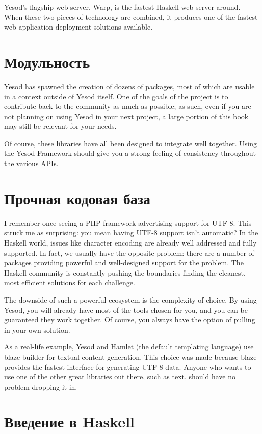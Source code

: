 Yesod's flagship web server, Warp, is the fastest Haskell web server around. When these two pieces of technology are combined, it produces one of the fastest web application deployment solutions available.

\section{Модульность}

Yesod has spawned the creation of dozens of packages, most of which are usable in a context outside of Yesod itself. One of the goals of the project is to contribute back to the community as much as possible; as such, even if you are not planning on using Yesod in your next project, a large portion of this book may still be relevant for your needs.

Of course, these libraries have all been designed to integrate well together. Using the Yesod Framework should give you a strong feeling of consistency throughout the various APIs.

\section{Прочная кодовая база}

I remember once seeing a PHP framework advertising support for UTF-8. This struck me as surprising: you mean having UTF-8 support isn't automatic? In the Haskell world, issues like character encoding are already well addressed and fully supported. In fact, we usually have the opposite problem: there are a number of packages providing powerful and well-designed support for the problem. The Haskell community is constantly pushing the boundaries finding the cleanest, most efficient solutions for each challenge.

The downside of such a powerful ecosystem is the complexity of choice. By using Yesod, you will already have most of the tools chosen for you, and you can be guaranteed they work together. Of course, you always have the option of pulling in your own solution.

As a real-life example, Yesod and Hamlet (the default templating language) use blaze-builder for textual content generation. This choice was made because blaze provides the fastest interface for generating UTF-8 data. Anyone who wants to use one of the other great libraries out there, such as text, should have no problem dropping it in.

\section{Введение в Haskell}

